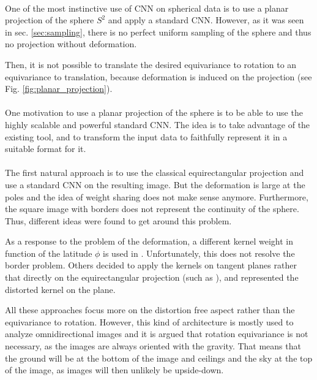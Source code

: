 \documentclass[11pt]{report}
\begin{document}
\paragraph*{}
One of the most instinctive use of CNN on spherical data is to use a planar projection of the sphere $S^2$ and apply a standard CNN. However, as it was seen in sec. \ref{sec:sampling}, there is no perfect uniform sampling of the sphere and thus no projection without deformation. 
    
Then, it is not possible to translate the desired equivariance to rotation to an equivariance to translation, because deformation is induced on the projection (see Fig. \ref{fig:planar_projection}).
\paragraph*{}
One motivation to use a planar projection of the sphere is to be able to use the highly scalable and powerful standard CNN. The idea is to take advantage of the existing tool, and to transform the input data to faithfully represent it in a suitable format for it.

\paragraph*{}
The first natural approach is to use the classical equirectangular projection and use a standard CNN on the resulting image. But the deformation is large at the poles and the idea of weight sharing does not make sense anymore. Furthermore, the square image with borders does not represent the continuity of the sphere. Thus, different ideas were found to get around this problem.

As a response to the problem of the deformation, a different kernel weight in function of the latitude $\phi$ is used in \cite{su_learning_2017}. Unfortunately, this does not resolve the border problem. Others decided to apply the kernels on tangent planes rather that directly on the equirectangular projection (such as \cite{ferrari_spherenet:_2018}), and represented the distorted kernel on the plane.

All these approaches focus more on the distortion free aspect rather than the equivariance to rotation. However, this kind of architecture is mostly used to analyze omnidirectional images and it is argued that rotation equivariance is not necessary, as the images are always oriented with the gravity. That means that the ground will be at the bottom of the image and ceilings and the sky at the top of the image, as images will then unlikely be upside-down.
\end{document}
